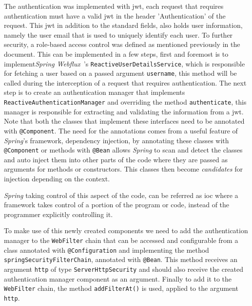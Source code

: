 The authentication was implemented with \acrfull{jwt}, each request that requires authentication must have a valid \acrshort{jwt} in the header 'Authentication' of the request. This \acrshort{jwt} in addition to the standard fields, also holds user information, namely the user email that is used to uniquely identify each user. 
To further security, a role-based access control was defined as mentioned previously in the document. This can be implemented in a few steps, first and foremost is to implement\textit{Spring Webflux}~\cite{spring-webflux}'s \lstinline{ReactiveUserDetailsService}, which is responsible for fetching a user based on a passed argument \lstinline{username}, this method will be called during the interception of a request that requires authentication. The next step is to create an authentication manager that implements \lstinline{ReactiveAuthenticationManager} and overriding the method \lstinline{authenticate}, this manager is responsible for extracting and validating the information from a \acrshort{jwt}. Note that both the classes that implement these interfaces need to be annotated with \lstinline{@Component}. The need for the annotations comes from a useful feature of \textit{Spring}'s framework, dependency injection, by annotating these classes with \lstinline{@Component} or methods with \lstinline{@Bean} allows \textit{Spring} to scan and detect the classes and auto inject them into other parts of the code where they are passed as arguments for methods or constructors. This classes then become \textit{candidates} for injection depending on the context. 

\textit{Spring} taking control of this aspect of the code, can be referred as \acrfull{ioc} where a framework takes control of a portion of the program or code, instead of the programmer explicitly controlling it.

 
To make use of this newly created components we need to add the authentication manager to the \lstinline{WebFilter} chain that can be accessed and configurable from a class annotated with \lstinline{@Configuration} and implementing the method \lstinline{springSecurityFilterChain}, annotated with \lstinline{@Bean}. 
This method receives an argument \lstinline{http} of type \lstinline{ServerHttpSecurity} and should also receive the created authentication manager component as an argument. 
Finally to add it to the \lstinline{WebFilter} chain, the method \lstinline{addFilterAt()} is used, applied to the argument \lstinline{http}. 


